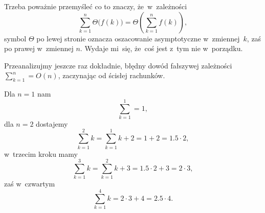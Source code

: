 \documentclass[a4paper,11pt]{article}
\begin{document}
\vspace{\spaceFour}




















\noindent
{} Trzeba poważnie przemyśleć co to znaczy, że~w~zależności
\begin{equation}
  \label{eq:CormenAtAl-WprowadzenieDoAlgorytmow-10}
  \sum_{ k = 1 }^{ n } \Theta\big( f( k ) \big) =
  \Theta\left( \sum_{ k = 1 }^{ n } f( k ) \right),
\end{equation}
symbol $\Theta$ po lewej stronie oznacza oszacowanie asymptotyczne
w~zmiennej~$k$, zaś po prawej w~zmiennej $n$. Wydaje mi~się, że~coś jest
z~tym nie w~porządku.

\vspace{\spaceFour}





\noindent
{} Przeanalizujmy jeszcze raz dokładnie, błędny dowód fałszywej
zależności $\sum_{ k = 1 }^{ n } = O( n )$, zaczynając od ścisłej rachunków.

Dla $n = 1$ nam
\begin{equation}
  \label{eq:CormenAtAl-WprowadzenieDoAlgorytmow-11}
  \sum_{ k = 1 }^{ 1 } = 1,
\end{equation}
dla $n = 2$ dostajemy
\begin{equation}
  \label{eq:CormenAtAl-WprowadzenieDoAlgorytmow-12}
  \sum_{ k = 1 }^{ 2 } k = \sum_{ k = 1 }^{ 1 } k + 2 = 1 + 2 = 1.5 \cdot 2,
\end{equation}
w~trzecim kroku mamy
\begin{equation}
  \label{eq:CormenAtAl-WprowadzenieDoAlgorytmow-13}
  \sum_{ k = 1 }^{ 3 } k = \sum_{ k = 1 }^{ 2 } k + 3 = 1.5 \cdot 2 + 3 = 2 \cdot 3,
\end{equation}
zaś w~czwartym
\begin{equation}
  \label{eq:CormenAtAl-WprowadzenieDoAlgorytmow-14}
  \sum_{ k = 1 }^{ 4 } k = 2 \cdot 3 + 4 = 2.5 \cdot 4.
\end{equation}
\end{document}
